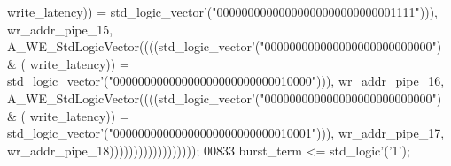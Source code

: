 \begin{DoxyCode}
{      write_latency}\textcolor{vhdlchar}{)}\textcolor{vhdlchar}{)} \textcolor{vhdlchar}{=} \textcolor{comment}{std\_logic\_vector}\textcolor{vhdlchar}{'}\textcolor{vhdlchar}{(}\textcolor{vhdllogic}{"00000000000000000000000000001111"}\textcolor{vhdlchar}{)}\textcolor{vhdlchar}{)}\textcolor{vhdlchar}{)}\textcolor{vhdlchar}{,} \textcolor{vhdlchar}{
      wr_addr_pipe_15}\textcolor{vhdlchar}{,} \textcolor{vhdlchar}{A\_WE\_StdLogicVector}\textcolor{vhdlchar}{(}\textcolor{vhdlchar}{(}\textcolor{vhdlchar}{(}\textcolor{vhdlchar}{(}\textcolor{comment}{std\_logic\_vector}\textcolor{vhdlchar}{'}\textcolor{vhdlchar}{(}\textcolor{vhdllogic}{"000000000000000000000000000"}\textcolor{vhdlchar}{)} \textcolor{vhdlchar}{&} \textcolor{vhdlchar}{(}\textcolor{vhdlchar}{
      write_latency}\textcolor{vhdlchar}{)}\textcolor{vhdlchar}{)} \textcolor{vhdlchar}{=} \textcolor{comment}{std\_logic\_vector}\textcolor{vhdlchar}{'}\textcolor{vhdlchar}{(}\textcolor{vhdllogic}{"00000000000000000000000000010000"}\textcolor{vhdlchar}{)}\textcolor{vhdlchar}{)}\textcolor{vhdlchar}{)}\textcolor{vhdlchar}{,} \textcolor{vhdlchar}{
      wr_addr_pipe_16}\textcolor{vhdlchar}{,} \textcolor{vhdlchar}{A\_WE\_StdLogicVector}\textcolor{vhdlchar}{(}\textcolor{vhdlchar}{(}\textcolor{vhdlchar}{(}\textcolor{vhdlchar}{(}\textcolor{comment}{std\_logic\_vector}\textcolor{vhdlchar}{'}\textcolor{vhdlchar}{(}\textcolor{vhdllogic}{"000000000000000000000000000"}\textcolor{vhdlchar}{)} \textcolor{vhdlchar}{&} \textcolor{vhdlchar}{(}\textcolor{vhdlchar}{
      write_latency}\textcolor{vhdlchar}{)}\textcolor{vhdlchar}{)} \textcolor{vhdlchar}{=} \textcolor{comment}{std\_logic\_vector}\textcolor{vhdlchar}{'}\textcolor{vhdlchar}{(}\textcolor{vhdllogic}{"00000000000000000000000000010001"}\textcolor{vhdlchar}{)}\textcolor{vhdlchar}{)}\textcolor{vhdlchar}{)}\textcolor{vhdlchar}{,} \textcolor{vhdlchar}{
      wr_addr_pipe_17}\textcolor{vhdlchar}{,} \textcolor{vhdlchar}{wr_addr_pipe_18}\textcolor{vhdlchar}{)}\textcolor{vhdlchar}{)}\textcolor{vhdlchar}{)}\textcolor{vhdlchar}{)}\textcolor{vhdlchar}{)}\textcolor{vhdlchar}{)}\textcolor{vhdlchar}{)}\textcolor{vhdlchar}{)}\textcolor{vhdlchar}{)}\textcolor{vhdlchar}{)}\textcolor{vhdlchar}{)}\textcolor{vhdlchar}{)}\textcolor{vhdlchar}{)}\textcolor{vhdlchar}{)}\textcolor{vhdlchar}{)}\textcolor{vhdlchar}{)}\textcolor{vhdlchar}{)}\textcolor{vhdlchar}{)};
00833   \textcolor{vhdlchar}{burst_term} \textcolor{vhdlchar}{<=} \textcolor{comment}{std\_logic}\textcolor{vhdlchar}{'}\textcolor{vhdlchar}{(}\textcolor{vhdlchar}{'}\textcolor{vhdllogic}{}\textcolor{vhdllogic}{1}\textcolor{vhdlchar}{'}\textcolor{vhdlchar}{)};

\end{DoxyCode}
